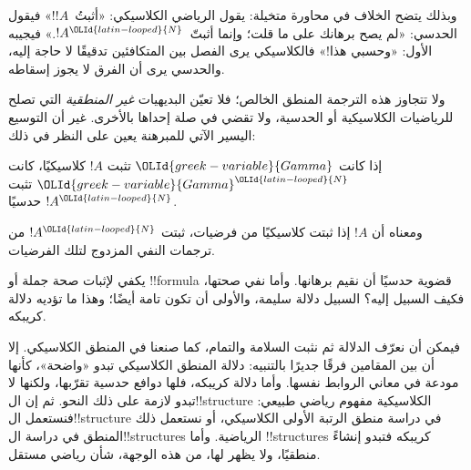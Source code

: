 \documentclass[../../../include/open-logic-section]{subfiles}
\begin{document}
وبذلك يتضح الخلاف في محاورة متخيلة: يقول الرياضي الكلاسيكي:
«أثبتُ~$!A$!» فيقول الحدسي: «لم يصح برهانك على ما قلت؛ وإنما
أثبتّ~$!A^\OLId{latin-looped}{N}$.» فيجيبه الأول: «وحسبي هذا!» فالكلاسيكي يرى
الفصل بين المتكافئين تدقيقًا لا حاجة إليه، والحدسي يرى أن
الفرق لا يجوز إسقاطه.

ولا تتجاوز هذه الترجمة المنطق الخالص؛ فلا تعيّن البديهيات
\emph{غير المنطقية} التي تصلح للرياضيات الكلاسيكية أو الحدسية،
ولا تقضي في صلة إحداها بالأخرى. غير أن التوسيع اليسير الآتي
للمبرهنة يعين على النظر في ذلك:

\begin{thm}
إذا كانت $\OLId{greek-variable}{Gamma}$ تثبت $!A$ كلاسيكيًا، كانت $\OLId{greek-variable}{Gamma}^\OLId{latin-looped}{N}$ تثبت $!A^\OLId{latin-looped}{N}$
حدسيًا.
\end{thm}

ومعناه أن $!A$ إذا ثبتت كلاسيكيًا من فرضيات، ثبتت
$!A^\OLId{latin-looped}{N}$ من ترجمات النفي المزدوج لتلك الفرضيات.

يكفي لإثبات صحة جملة أو !!{formula} قضوية حدسيًا أن نقيم
برهانها. وأما نفي صحتها، فكيف السبيل إليه؟ السبيل دلالة
سليمة، والأولى أن تكون تامة أيضًا؛ وهذا ما تؤديه دلالة كريبكه.

فيمكن أن نعرّف الدلالة ثم نثبت السلامة والتمام، كما صنعنا في
المنطق الكلاسيكي. إلا أن بين المقامين فرقًا جديرًا بالتنبيه:
دلالة المنطق الكلاسيكي تبدو «واضحة»، كأنها مودعة في معاني
الروابط نفسها. وأما دلالة كريبكه، فلها دوافع حدسية تقرّبها،
ولكنها لا تبدو لازمة على ذلك النحو. ثم إن ال!!{structure}
الكلاسيكية مفهوم رياضي طبيعي: فنستعمل ال!!{structure} في
دراسة منطق الرتبة الأولى الكلاسيكي، أو نستعمل ذلك المنطق في
دراسة ال!!{structure}s الرياضية. وأما !!{structure}s كريبكه
فتبدو إنشاءً منطقيًا، ولا يظهر لها، من هذه الوجهة، شأن رياضي
مستقل.
\end{document}
